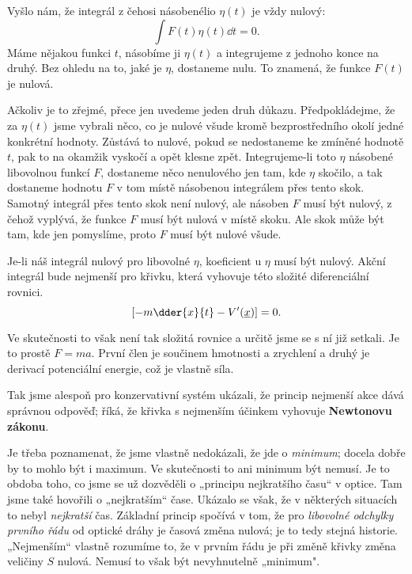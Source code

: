     Vyšlo nám, že integrál z čehosi násobenélio \(\eta(t)\) je vždy nulový:
    \begin{equation*}
      \int F(t)\eta(t)\dd{t} = 0.
    \end{equation*} 
    Máme nějakou funkci \(t\), násobíme ji \(\eta(t)\) a integrujeme z jednoho konce na druhý. Bez
    ohledu na to, jaké je \(\eta\), dostaneme nulu. To znamená, že funkce \(F(t)\) je nulová.
    
    Ačkoliv je to zřejmé, přece jen uvedeme jeden druh důkazu. Předpokládejme, že za \(\eta(t)\)
    jsme vybrali něco, co je nulové všude kromě bezprostředního okolí jedné konkrétní hodnoty.
    Zůstává to nulové, pokud se nedostaneme ke zmíněné hodnotě \(t\), pak to na okamžik vyskočí a
    opět klesne zpět. Integrujeme-li toto \(\eta\) násobené libovolnou funkcí \(F\), dostaneme něco
    nenulového jen tam, kde \(\eta\) skočilo, a tak dostaneme hodnotu \(F\) v tom místě násobenou
    integrálem přes tento skok. Samotný integrál přes tento skok není nulový, ale násoben \(F\) musí
    být nulový, z čehož vyplývá, že funkce \(F\) musí být nulová v místě skoku. Ale skok může být
    tam, kde jen pomyslíme, proto \(F\) musí být nulové všude.  


    Je-li náš integrál nulový pro libovolné \(\eta\), koeficient u \(\eta\) musí být nulový. Akční
    integrál bude nejmenší pro křivku, která vyhovuje této složité diferenciální rovnici. 
    \begin{equation*}
      \left[-m\dder{x}{t} -V'(\underline{x})\right] = 0.
    \end{equation*}  
    
    Ve skutečnosti to však není tak složitá rovnice a určitě jsme se s ní již setkali. Je to prostě
    \(F=ma\). První člen je součinem hmotnosti a zrychlení a druhý je derivací potenciální energie,
    což je vlastně síla.

    Tak jsme alespoň pro konzervativní systém ukázali, že princip nejmenší akce dává správnou
    odpověď; říká, že křivka s nejmenším účinkem vyhovuje \textbf{Newtonovu zákonu}.

    Je třeba poznamenat, že jsme vlastně nedokázali, že jde o \emph{minimum}; docela dobře by to
    mohlo být i maximum. Ve skutečnosti to ani minimum být nemusí. Je to obdoba toho, co jsme se už
    dozvěděli o „principu nejkratšího času“ v optice. Tam jsme také hovořili o „nejkratším“ čase.
    Ukázalo se však, že v některých situacích to nebyl \emph{nejkratší} čas. Základní princip
    spočívá v tom, že pro \emph{libovolné odchylky prvního řádu} od optické dráhy je časová změna
    nulová; je to tedy stejná historie. „Nejmenším“ vlastně rozumíme to, že v prvním řádu je při
    změně křivky změna veličiny \(S\) nulová. Nemusí to však být nevyhnutelně „minimum".
    
